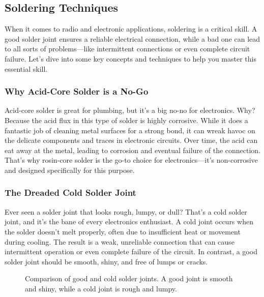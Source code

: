 \subsection{Soldering Techniques}
\label{subsec:soldering}

When it comes to radio and electronic applications, soldering is a critical skill. A good solder joint ensures a reliable electrical connection, while a bad one can lead to all sorts of problems—like intermittent connections or even complete circuit failure. Let’s dive into some key concepts and techniques to help you master this essential skill.

\subsubsection*{Why Acid-Core Solder is a No-Go}
Acid-core solder is great for plumbing, but it’s a big no-no for electronics. Why? Because the acid flux in this type of solder is highly corrosive. While it does a fantastic job of cleaning metal surfaces for a strong bond, it can wreak havoc on the delicate components and traces in electronic circuits. Over time, the acid can eat away at the metal, leading to corrosion and eventual failure of the connection. That’s why rosin-core solder is the go-to choice for electronics—it’s non-corrosive and designed specifically for this purpose.

\subsubsection*{The Dreaded Cold Solder Joint}
Ever seen a solder joint that looks rough, lumpy, or dull? That’s a cold solder joint, and it’s the bane of every electronics enthusiast. A cold joint occurs when the solder doesn’t melt properly, often due to insufficient heat or movement during cooling. The result is a weak, unreliable connection that can cause intermittent operation or even complete failure of the circuit. In contrast, a good solder joint should be smooth, shiny, and free of lumps or cracks.

\begin{figure}[h]
    \centering
    \caption{Comparison of good and cold solder joints. A good joint is smooth and shiny, while a cold joint is rough and lumpy.}
    \label{fig:solder-joints}
\end{figure}

